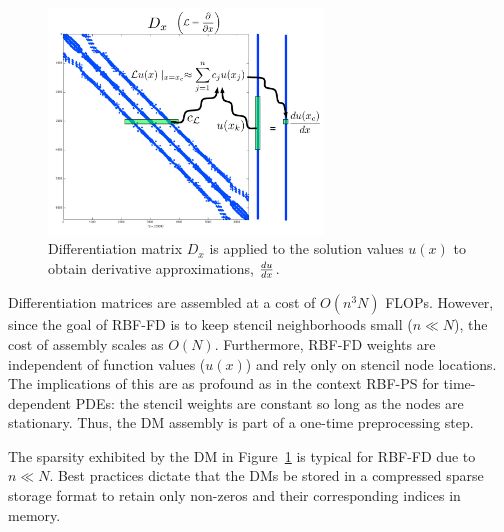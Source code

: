 \documentclass[11pt]{report}
\begin{document}
{\begin{figure}[htbp]
	\centering
		\includegraphics[width=0.65\textwidth]{omnigraffle/DM_rows.pdf}
		\caption{Differentiation matrix $D_x$ is applied to the solution values $u(x)$ to obtain derivative approximations, $\frac{d u}{d x}$. }
		\label{fig:example_DM_rows}
\end{figure}

Differentiation matrices are assembled at a cost of $O(n^3 N)$ FLOPs. However, since the goal of RBF-FD is to keep stencil neighborhoods small ($n \ll N$), the cost of assembly scales as $O(N)$. Furthermore, RBF-FD weights are independent of function values ($u(x)$) and rely only on stencil node locations. The implications of this are as profound as in the context RBF-PS for time-dependent PDEs: the stencil weights are constant so long as the nodes are stationary. Thus, the DM assembly is part of a one-time preprocessing step.%


The sparsity exhibited by the DM in Figure~\ref{fig:example_DM_rows} is typical for RBF-FD due to $n \ll N$. 
Best practices dictate that the DMs be stored in a compressed sparse storage format to retain only non-zeros and their corresponding indices in memory. 


}
\end{document}

